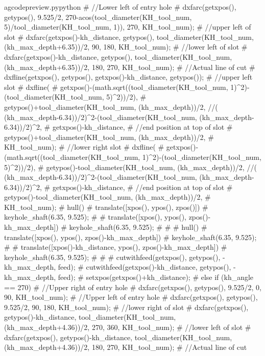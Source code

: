 \documentclass{ltxdoc}
\begin{document}
\begin{writecode}{a}{gcodepreview.py}{python}
{#    //Lower left of entry hole
#    dxfarc(getxpos(), getypos(), 9.525/2, 270-acos(tool_diameter(KH_tool_num, 5)/tool_diameter(KH_tool_num, 1)), 270, KH_tool_num);
#    //upper left of slot
#    dxfarc(getxpos()-kh_distance, getypos(), tool_diameter(KH_tool_num, (kh_max_depth+6.35))/2, 90, 180, KH_tool_num);
#    //lower left of slot
#    dxfarc(getxpos()-kh_distance, getypos(), tool_diameter(KH_tool_num, (kh_max_depth+6.35))/2, 180, 270, KH_tool_num);
#    //Actual line of cut
#    dxfline(getxpos(), getypos(), getxpos()-kh_distance, getypos());
#    //upper left slot
#    dxfline(
#        getxpos()-(math.sqrt((tool_diameter(KH_tool_num, 1)^2)-(tool_diameter(KH_tool_num, 5)^2))/2), 
#        getypos()+tool_diameter(KH_tool_num, (kh_max_depth))/2, //( (kh_max_depth-6.34))/2)^2-(tool_diameter(KH_tool_num, (kh_max_depth-6.34))/2)^2, 
#        getxpos()-kh_distance, 
#    //end position at top of slot
#        getypos()+tool_diameter(KH_tool_num, (kh_max_depth))/2, 
#        KH_tool_num);
#    //lower right slot
#    dxfline(
#        getxpos()-(math.sqrt((tool_diameter(KH_tool_num, 1)^2)-(tool_diameter(KH_tool_num, 5)^2))/2), 
#        getypos()-tool_diameter(KH_tool_num, (kh_max_depth))/2, //( (kh_max_depth-6.34))/2)^2-(tool_diameter(KH_tool_num, (kh_max_depth-6.34))/2)^2, 
#        getxpos()-kh_distance, 
#    //end position at top of slot
#        getypos()-tool_diameter(KH_tool_num, (kh_max_depth))/2, 
#        KH_tool_num);
#    hull(){
#      translate([xpos(), ypos(), zpos()]){
#        keyhole_shaft(6.35, 9.525);
#      }
#      translate([xpos(), ypos(), zpos()-kh_max_depth]){
#        keyhole_shaft(6.35, 9.525);
#      }
#    }
#    hull(){
#      translate([xpos(), ypos(), zpos()-kh_max_depth]){
#        keyhole_shaft(6.35, 9.525);
#      }
#      translate([xpos()-kh_distance, ypos(), zpos()-kh_max_depth]){
#        keyhole_shaft(6.35, 9.525);
#      }
#    }
#    cutwithfeed(getxpos(), getypos(), -kh_max_depth, feed);
#    cutwithfeed(getxpos()-kh_distance, getypos(), -kh_max_depth, feed);
#    setxpos(getxpos()+kh_distance);
#  } else if (kh_angle == 270) {
#    //Upper right of entry hole
#    dxfarc(getxpos(), getypos(), 9.525/2, 0, 90, KH_tool_num);
#    //Upper left of entry hole
#    dxfarc(getxpos(), getypos(), 9.525/2, 90, 180, KH_tool_num);
#    //lower right of slot
#    dxfarc(getxpos(), getypos()-kh_distance, tool_diameter(KH_tool_num, (kh_max_depth+4.36))/2, 270, 360, KH_tool_num);
#    //lower left of slot
#    dxfarc(getxpos(), getypos()-kh_distance, tool_diameter(KH_tool_num, (kh_max_depth+4.36))/2, 180, 270, KH_tool_num);
#    //Actual line of cut
}
\end{writecode}
\end{document}
